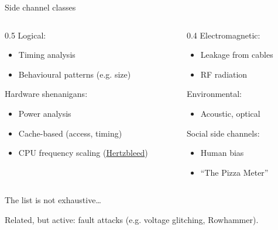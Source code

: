 \begin{frame}{Side channel classes}
  \begin{columns}[T,onlytextwidth]
    \begin{column}{0.5\textwidth}
      \pause
      Logical:
      \begin{itemize}[<+(1)->]
        \item Timing analysis
        \item Behavioural patterns (e.g. size)
      \end{itemize}

      \pause
      Hardware shenanigans:
      \begin{itemize}[<+(1)->]
        \item Power analysis
        \item Cache-based (access, timing)
        \item CPU frequency scaling (\href{https://www.hertzbleed.com}{Hertzbleed})
      \end{itemize}
      \end{column}
    \begin{column}{0.4\textwidth}
      \pause
      Electromagnetic:
      \begin{itemize}[<+(1)->]
        \item Leakage from cables
        \item RF radiation
      \end{itemize}

      \pause
      Environmental:
      \begin{itemize}[<+(1)->]
        \item Acoustic, optical
      \end{itemize}

      \pause
      Social side channels:
      \begin{itemize}[<+(1)->]
        \item Human bias
        \item \enquote{The Pizza Meter}
      \end{itemize}
    \end{column}
  \end{columns}

  \vspace*{0.5em}

  \pause
  The list is not exhaustive\dots

  \pause
  Related, but active: fault attacks (e.g. voltage glitching, Rowhammer).
\end{frame}


